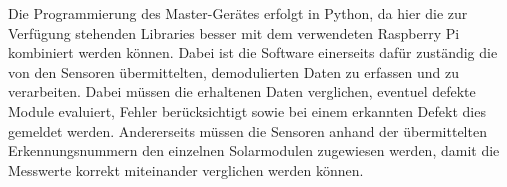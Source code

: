 Die  Programmierung  des  Master-Ger\"ates  erfolgt in  Python,  da  hier  die
zur  Verf\"ugung  stehenden Libraries  besser  mit  dem verwendeten  Raspberry
Pi  kombiniert  werden k\"onnen. Dabei  ist  die  Software einerseits  daf\"ur
zust\"andig  die  von den  Sensoren  \"ubermittelten,  demodulierten Daten  zu
erfassen und  zu verarbeiten. Dabei m\"ussen die  erhaltenen Daten verglichen,
eventuel  defekte Module  evaluiert, Fehler  ber\"ucksichtigt sowie  bei einem
erkannten  Defekt dies  gemeldet  werden. Andererseits  m\"ussen die  Sensoren
anhand  der  \"ubermittelten   Erkennungsnummern  den  einzelnen  Solarmodulen
zugewiesen werden,  damit die Messwerte korrekt  miteinander verglichen werden
k\"onnen.
